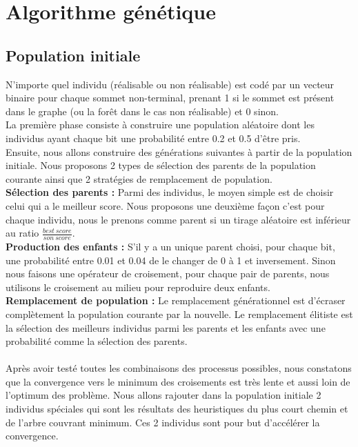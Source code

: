 \documentclass[12pt,a4paper]{article}
\begin{document}
\section{Algorithme génétique}
\subsection{Population initiale}
N'importe quel individu (réalisable ou non réalisable) est codé par un vecteur binaire pour chaque sommet non-terminal, prenant 1 si le sommet est présent dans le graphe (ou la forêt dans le cas non réalisable) et 0 sinon.\\
La première phase consiste à construire une population aléatoire dont les individus ayant chaque bit une probabilité entre 0.2 et 0.5 d'être pris.\\
Ensuite, nous allons construire des générations suivantes à partir de la population initiale. Nous proposons 2 types de sélection des parents de la population courante ainsi que 2 stratégies de remplacement de population.\\
\textbf{Sélection des parents : }Parmi des individus, le moyen simple est de choisir celui qui a le meilleur score. Nous proposons une deuxième façon c'est pour chaque individu, nous le prenons comme parent si un tirage aléatoire est inférieur au ratio $\frac{best\ score}{son\ score}$.\\
\textbf{Production des enfants : } S'il y a un unique parent choisi, pour chaque bit, une probabilité entre 0.01 et 0.04 de le changer de 0 à 1 et inversement. Sinon nous faisons une opérateur de croisement, pour chaque pair de parents, nous utilisons le croisement au milieu pour reproduire deux enfants.\\
\textbf{Remplacement de population : } Le remplacement générationnel est d'écraser complètement la population courante par la nouvelle. Le remplacement élitiste est la sélection des meilleurs individus parmi les parents et les enfants avec une probabilité comme la sélection des parents. \\\\
Après avoir testé toutes les combinaisons des processus possibles, nous constatons que la convergence vers le minimum des croisements est très lente et aussi loin de l'optimum des problème. Nous allons rajouter dans la population initiale 2 individus spéciales qui sont les résultats des heuristiques du plus court chemin et de l'arbre couvrant minimum. Ces 2 individus sont pour but d'accélérer la convergence.
\end{document}
